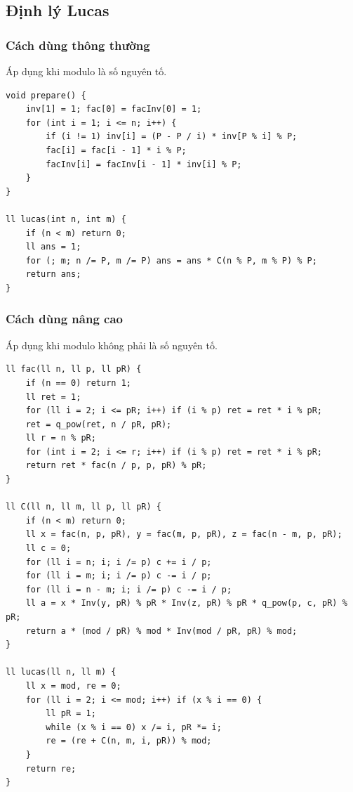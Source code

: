 \documentclass[11pt]{article}
\begin{document}
\subsection{Định lý Lucas}

\subsubsection{Cách dùng thông thường}

Áp dụng khi modulo là số nguyên tố.

\begingroup
\footnotesize
\begin{verbatim}
void prepare() {
    inv[1] = 1; fac[0] = facInv[0] = 1;
    for (int i = 1; i <= n; i++) {
        if (i != 1) inv[i] = (P - P / i) * inv[P % i] % P;
        fac[i] = fac[i - 1] * i % P;
        facInv[i] = facInv[i - 1] * inv[i] % P;
    }
}

ll lucas(int n, int m) {
    if (n < m) return 0;
    ll ans = 1;
    for (; m; n /= P, m /= P) ans = ans * C(n % P, m % P) % P;
    return ans;
}
\end{verbatim}
\endgroup

\subsubsection{Cách dùng nâng cao}

Áp dụng khi modulo không phải là số nguyên tố.

\begingroup
\footnotesize
\begin{verbatim}
ll fac(ll n, ll p, ll pR) {
    if (n == 0) return 1;
    ll ret = 1;
    for (ll i = 2; i <= pR; i++) if (i % p) ret = ret * i % pR;
    ret = q_pow(ret, n / pR, pR);
    ll r = n % pR;
    for (int i = 2; i <= r; i++) if (i % p) ret = ret * i % pR;
    return ret * fac(n / p, p, pR) % pR;
}

ll C(ll n, ll m, ll p, ll pR) {
    if (n < m) return 0;
    ll x = fac(n, p, pR), y = fac(m, p, pR), z = fac(n - m, p, pR);
    ll c = 0;
    for (ll i = n; i; i /= p) c += i / p;
    for (ll i = m; i; i /= p) c -= i / p;
    for (ll i = n - m; i; i /= p) c -= i / p;
    ll a = x * Inv(y, pR) % pR * Inv(z, pR) % pR * q_pow(p, c, pR) % pR;
    return a * (mod / pR) % mod * Inv(mod / pR, pR) % mod;
}

ll lucas(ll n, ll m) {
    ll x = mod, re = 0;
    for (ll i = 2; i <= mod; i++) if (x % i == 0) {
        ll pR = 1;
        while (x % i == 0) x /= i, pR *= i;
        re = (re + C(n, m, i, pR)) % mod;
    }
    return re;
}
\end{verbatim}
\endgroup
\end{document}
